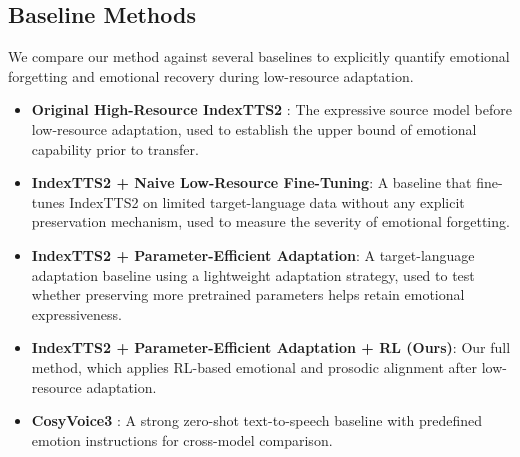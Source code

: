 \subsection{Baseline Methods}
We compare our method against several baselines to explicitly quantify emotional forgetting and emotional recovery during low-resource adaptation.
\begin{itemize}
    \item \textbf{Original High-Resource IndexTTS2} \citep{Zhou2025IndexTTS2AB}: The expressive source model before low-resource adaptation, used to establish the upper bound of emotional capability prior to transfer.
    \item \textbf{IndexTTS2 + Naive Low-Resource Fine-Tuning}: A baseline that fine-tunes IndexTTS2 on limited target-language data without any explicit preservation mechanism, used to measure the severity of emotional forgetting.
    \item \textbf{IndexTTS2 + Parameter-Efficient Adaptation}: A target-language adaptation baseline using a lightweight adaptation strategy, used to test whether preserving more pretrained parameters helps retain emotional expressiveness.
    \item \textbf{IndexTTS2 + Parameter-Efficient Adaptation + RL (Ours)}: Our full method, which applies RL-based emotional and prosodic alignment after low-resource adaptation.
    \item \textbf{CosyVoice3} \citep{2025arXiv250517589D}: A strong zero-shot text-to-speech baseline with predefined emotion instructions for cross-model comparison.
\end{itemize}

